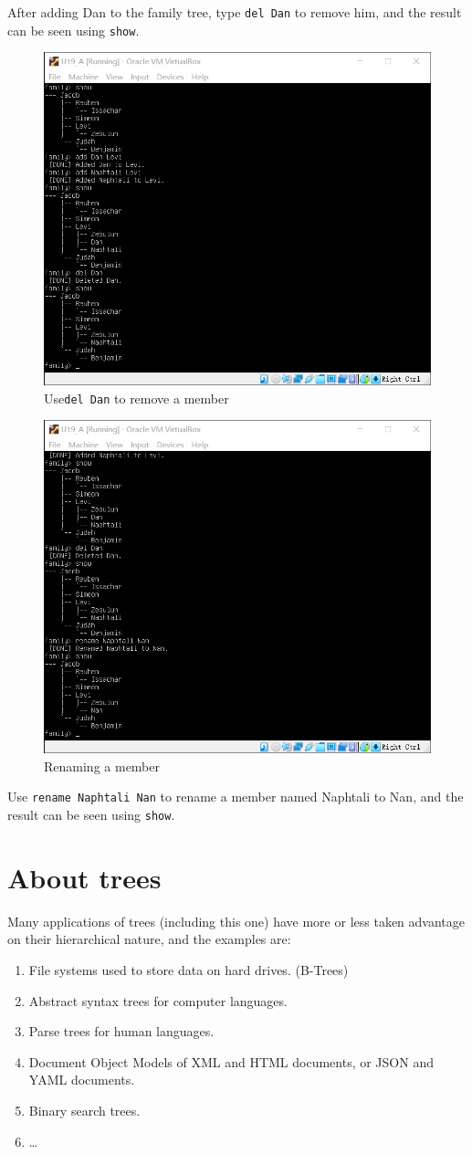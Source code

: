 \documentclass[cn,black,12pt,normal]{elegantnote}
\begin{document}
After adding Dan to the family tree, type \lstinline{del Dan} to remove him, and the result can be seen using \lstinline{show}.
\begin{figure}[H]
    \centering
    \includegraphics[width=0.7\linewidth]{image/f04.jpg}
    \caption{Use\lstinline{del Dan} to remove a member}
\end{figure}
\begin{figure}[H]
    \centering
    \includegraphics[width=0.7\linewidth]{image/f05.jpg}
    \caption{Renaming a member}
\end{figure}
Use \lstinline{rename Naphtali Nan} to rename a member named Naphtali to Nan, and the result can be seen using \lstinline{show}.


\section{About trees}

Many applications of trees (including this one) have more or less taken advantage on their hierarchical nature, and the examples are:
\begin{enumerate}
    \item File systems used to store data on hard drives. (B-Trees)
    \item Abstract syntax trees for computer languages.
    \item Parse trees for human languages.
    \item Document Object Models of XML and HTML documents, or JSON and YAML documents.
    \item Binary search trees.
    \item \dots
\end{enumerate}
\end{document}
